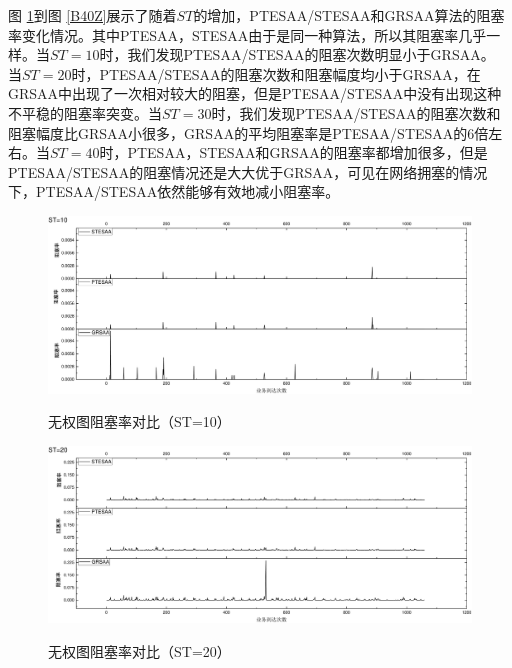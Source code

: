 图 \ref{B10Z}到图 \ref{B40Z}展示了随着$ST$的增加，PTESAA/STESAA和GRSAA算法的阻塞率变化情况。其中PTESAA，STESAA由于是同一种算法，所以其阻塞率几乎一样。当$ST=10$时，我们发现PTESAA/STESAA的阻塞次数明显小于GRSAA。 当$ST=20$时，PTESAA/STESAA的阻塞次数和阻塞幅度均小于GRSAA，在GRSAA中出现了一次相对较大的阻塞，但是PTESAA/STESAA中没有出现这种不平稳的阻塞率突变。当$ST=30$时，我们发现PTESAA/STESAA的阻塞次数和阻塞幅度比GRSAA小很多，GRSAA的平均阻塞率是PTESAA/STESAA的6倍左右。当$ST=40$时，PTESAA，STESAA和GRSAA的阻塞率都增加很多，但是PTESAA/STESAA的阻塞情况还是大大优于GRSAA，可见在网络拥塞的情况下，PTESAA/STESAA依然能够有效地减小阻塞率。
\begin{figure}
\setlength{\abovecaptionskip}{-0.5cm}
\begin{center}
{\includegraphics[width=1 \textwidth]{figures/B10Z.pdf}}
\end{center}
\caption{{\footnotesize{无权图阻塞率对比（ST=10）}}}
\label{B10Z}
\end{figure}
\begin{figure}
\setlength{\abovecaptionskip}{-0.5cm}
\begin{center}
{\includegraphics[width=1 \textwidth]{figures/B20Z.pdf}}
\end{center}
\caption{{\footnotesize{无权图阻塞率对比（ST=20）}}}
\label{B20Z}
\end{figure}
